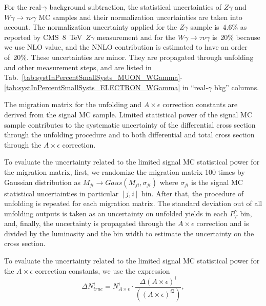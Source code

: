 
For the real-$\gamma$ background subtraction, the statistical uncertainties of $Z\gamma$ and $W\gamma\rightarrow\tau\nu\gamma$ MC samples and their normalization uncertainties are taken into account. The normalization uncertainty applied for the $Z\gamma$ sample is~4.6\% as reported by CMS~8~TeV~$Z\gamma$ measurement and for the $W\gamma\rightarrow\tau\nu\gamma$ is~20\% because we use NLO value, and the NNLO contribution is estimated to have an order of~20\%. These uncertainties are minor.  They are propagated through unfolding and other measurement steps, and are listed in Tab.~\ref{tab:systInPercentSmallSysts_MUON_WGamma}-\ref{tab:systInPercentSmallSysts_ELECTRON_WGamma} in ``real-$\gamma$ bkg'' columns.


The migration matrix for the unfolding and $A\times\epsilon$ correction constants are derived from the signal MC sample. Limited statistical power of the signal MC sample contributes to the systematic uncertainty of the differential cross section through the unfolding procedure and to both differential and total cross section through the  $A\times\epsilon$ correction. 

To evaluate the uncertainty related to the limited signal MC statistical power for the migration matrix, first, we randomize the migration matrix 100 times by Gaussian distribution as $M_{ji}\rightarrow Gaus(M_{ji},\sigma_{ji})$ where $\sigma_{ji}$ is the signal MC statistical uncertainties in particular $[j,i]$ bin. After that, the procedure of unfolding is repeated for each migration matrix. The standard deviation out of all unfolding outputs is taken as an uncertainty on unfolded yields in each $P_T^{\gamma}$ bin, and, finally, the uncertainty is propagated through the $A\times\epsilon$ correction and is divided by the luminosity and the bin width to estimate the uncertainty on the cross section.

To evaluate the uncertainty related to the limited signal MC statistical power for the $A \times \epsilon$ correction constants, we use the expression
\begin{equation}
\Delta N_{true}^i= N_{A\times \epsilon}^i \cdot \frac{\Delta{(A\times \epsilon)^i}} { ((A\times \epsilon)^{i2})}, 
\end{equation}


